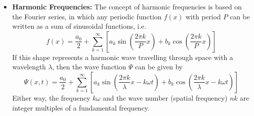 \documentclass{../../oss-handout}
\begin{document}
\begin{itemize}[leftmargin=10pt]
\item\textbf{Harmonic Frequencies:} The concept of harmonic frequencies is
  based on the Fourier series, in which any periodic function $f(x)$ with
  period $P$ can be written as a sum of sinusoidal functions, i.e.\
  \begin{displaymath}
    f(x)=\frac{a_0}2 + \sum_{k=1}^\infty 
    \left[
      a_k\sin\left(\frac{2\pi k}Px\right) +
      b_k\cos\left(\frac{2\pi k}Px\right)
    \right]
  \end{displaymath}
  If this shape represents a harmonic wave travelling through space with a
  wavelength $\lambda$, then the wave function $\Psi$ can be given by
  \begin{displaymath}
    \Psi(x,t)=\frac{a_0}2 + \sum_{k=1}^\infty
    \left[
      a_k\sin\left(\frac{2\pi k}\lambda x-k\omega t\right) +
      b_k\cos\left(\frac{2\pi k}\lambda x-k\omega t\right)
    \right]
  \end{displaymath}
  Either way, the frequency $k\omega$ and the wave number (spatial frequency)
  $nk$ are integer multiples of a fundamental frequency.
\end{itemize}
\end{document}
